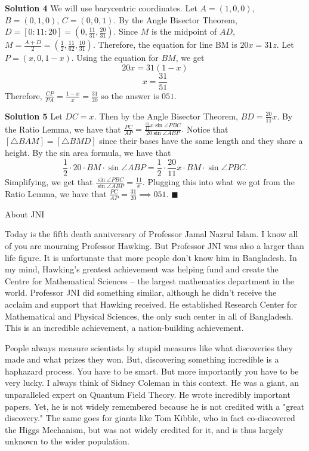 \documentclass[a4paper,11pt]{article}
\begin{document}
\textbf{Solution 4}
We will use barycentric coordinates. Let $A = (1, 0, 0)$, $B = (0, 1, 0)$, $C = (0, 0, 1)$. By the Angle Bisector Theorem, $D = [0:11:20] = \left(0, \frac{11}{31}, \frac{20}{31}\right)$. Since $M$ is the midpoint of $AD$, $M = \frac{A + D}{2} = \left(\frac{1}{2}, \frac{11}{62}, \frac{10}{31}\right)$. Therefore, the equation for line BM is $20x = 31z$. Let $P = (x, 0, 1-x)$. Using the equation for $BM$, we get \[20x = 31(1-x)\]\[x = \frac{31}{51}\] Therefore, $\frac{CP}{PA} = \frac{1-x}{x} = \frac{31}{20}$ so the answer is $\boxed{051}$.

\textbf{Solution 5}
Let $DC=x$. Then by the Angle Bisector Theorem, $BD=\frac{20}{11}x$. By the Ratio Lemma, we have that $\frac{PC}{AP}=\frac{\frac{31}{11}x\sin\angle PBC}{20\sin\angle ABP}.$ Notice that $[\triangle BAM]=[\triangle BMD]$ since their bases have the same length and they share a height. By the sin area formula, we have that \[\frac{1}{2}\cdot20\cdot BM\cdot \sin\angle ABP=\frac{1}{2}\cdot \frac{20}{11}x\cdot BM\cdot\sin\angle PBC.\] Simplifying, we get that $\frac{\sin\angle PBC}{\sin\angle ABP}=\frac{11}{x}.$ Plugging this into what we got from the Ratio Lemma, we have that $\frac{PC}{AP}=\frac{31}{20}\implies\boxed{051.}$
 \hfill $\blacksquare$
 
\begin{center}
\begin{large}
 About JNI
\end{large}
\end{center} 
 
 Today is the fifth death anniversary of Professor Jamal Nazrul Islam. I know all of you are mourning Professor Hawking. But Professor JNI was also a larger than life figure. It is unfortunate that more people don't know him in Bangladesh. In my mind, Hawking's greatest achievement was helping fund and create the Centre for Mathematical Sciences -- the largest mathematics department in the world. Professor JNI did something similar, although he didn't receive the acclaim and support that Hawking received. He established Research Center for Mathematical and Physical Sciences, the only such center in all of Bangladesh. This is an incredible achievement, a nation-building achievement.

People always measure scientists by stupid measures like what discoveries they made and what prizes they won. But, discovering something incredible is a haphazard process. You have to be smart. But more importantly you have to be very lucky. I always think of Sidney Coleman in this context. He was a giant, an unparalleled expert on Quantum Field Theory. He wrote incredibly important papers. Yet, he is not widely remembered because he is not credited with a "great discovery." The same goes for giants like Tom Kibble, who in fact co-discovered the Higgs Mechanism, but was not widely credited for it, and is thus largely unknown to the wider population.
\end{document}
